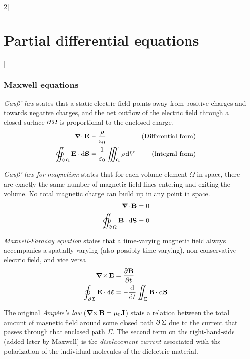 \documentclass[../../../main_math.tex]{subfiles}
\begin{document}
\begin{multicols}{2}[\section{Partial differential equations}]
  \subsubsection{Maxwell equations}
  \begin{proposition}
    \emph{Gau\ss' law} states that a static electric field points away from positive charges and towards negative charges, and the net outflow of the electric field through a closed surface $\operatorname{\partial}{\Omega}$ is proportional to the enclosed charge.
    \begin{align*}
      \operatorname{\boldsymbol{\mathrm{\nabla}}\cdot}\boldsymbol{\mathrm{E}}                                 & =\frac{\rho}{\varepsilon_0}                     & \text{(Differential form)} \\
      \oiint_{\operatorname{\partial}{\Omega}}\boldsymbol{\mathrm{E}}\cdot \dd{\boldsymbol{\mathrm{S}}} & =\frac{1}{\varepsilon_0}\iiint_\Omega\rho\dd{V} & \text{(Integral form)}
    \end{align*}
  \end{proposition}
  \begin{proposition}
    \emph{Gau\ss' law for magnetism} states that for each volume element $\Omega$ in space, there are exactly the same number of magnetic field lines entering and exiting the volume. No total magnetic charge can build up in any point in space.
    \begin{align*}
      \operatorname{\boldsymbol{\mathrm{\nabla}}\cdot}\boldsymbol{\mathrm{B}}                                 & =0 \\
      \oiint_{\operatorname{\partial}{\Omega}}\boldsymbol{\mathrm{B}}\cdot \dd{\boldsymbol{\mathrm{S}}} & =0
    \end{align*}
  \end{proposition}
  \begin{proposition}
    \emph{Maxwell-Faraday equation} states that a time-varying magnetic field always accompanies a spatially varying (also possibly time-varying), non-conservative electric field, and vice versa
    \begin{align*}
      \operatorname{\boldsymbol{\mathrm{\nabla}}\times}\boldsymbol{\mathrm{E}}                                   & =\pdv{\boldsymbol{\mathrm{B}}}{t}                              \\
      \oint_{\operatorname{\partial}{\Sigma}}\boldsymbol{\mathrm{E}}\cdot \dd{\boldsymbol{\mathrm{\ell}}} & =-\dv{}{t}\iint_\Sigma\boldsymbol{\mathrm{B}}\cdot \dd{\boldsymbol{\mathrm{S}}}
    \end{align*}
  \end{proposition}
  \begin{proposition}
    The original \emph{Ampère's law} ($\operatorname{\boldsymbol{\mathrm{\nabla}}\times}\boldsymbol{\mathrm{B}}=\mu_0\boldsymbol{\mathrm{J}}$) stats a relation between the total amount of magnetic field around some closed path $\operatorname{\partial}{\Sigma}$ due to the current that passes through that enclosed path $\Sigma$. The second term on the right-hand-side (added later by Maxwell) is the \emph{displacement current} associated with the polarization of the individual molecules of the dielectric material.

\end{proposition}
\end{multicols}
\end{document}
